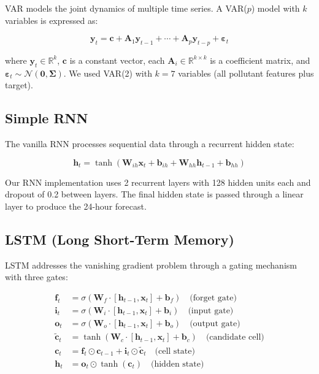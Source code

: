 VAR models the joint dynamics of multiple time series. A VAR($p$) model with $k$ variables is expressed as:

\begin{equation}
    \mathbf{y}_t = \mathbf{c} + \mathbf{A}_1 \mathbf{y}_{t-1} + \cdots + \mathbf{A}_p \mathbf{y}_{t-p} + \boldsymbol{\varepsilon}_t
\end{equation}

where $\mathbf{y}_t \in \mathbb{R}^k$, $\mathbf{c}$ is a constant vector, each $\mathbf{A}_i \in \mathbb{R}^{k \times k}$ is a coefficient matrix, and $\boldsymbol{\varepsilon}_t \sim \mathcal{N}(\mathbf{0}, \boldsymbol{\Sigma})$. We used VAR(2) with $k = 7$ variables (all pollutant features plus target).

\subsection{Simple RNN}

The vanilla RNN processes sequential data through a recurrent hidden state:

\begin{equation}
    \mathbf{h}_t = \tanh(\mathbf{W}_{ih} \mathbf{x}_t + \mathbf{b}_{ih} + \mathbf{W}_{hh} \mathbf{h}_{t-1} + \mathbf{b}_{hh})
\end{equation}

Our RNN implementation uses 2 recurrent layers with 128 hidden units each and dropout of 0.2 between layers. The final hidden state is passed through a linear layer to produce the 24-hour forecast.

\subsection{LSTM (Long Short-Term Memory)}

LSTM addresses the vanishing gradient problem through a gating mechanism with three gates:

\begin{align}
    \mathbf{f}_t &= \sigma(\mathbf{W}_f \cdot [\mathbf{h}_{t-1}, \mathbf{x}_t] + \mathbf{b}_f) \quad \text{(forget gate)} \\
    \mathbf{i}_t &= \sigma(\mathbf{W}_i \cdot [\mathbf{h}_{t-1}, \mathbf{x}_t] + \mathbf{b}_i) \quad \text{(input gate)} \\
    \mathbf{o}_t &= \sigma(\mathbf{W}_o \cdot [\mathbf{h}_{t-1}, \mathbf{x}_t] + \mathbf{b}_o) \quad \text{(output gate)} \\
    \tilde{\mathbf{c}}_t &= \tanh(\mathbf{W}_c \cdot [\mathbf{h}_{t-1}, \mathbf{x}_t] + \mathbf{b}_c) \quad \text{(candidate cell)} \\
    \mathbf{c}_t &= \mathbf{f}_t \odot \mathbf{c}_{t-1} + \mathbf{i}_t \odot \tilde{\mathbf{c}}_t \quad \text{(cell state)} \\
    \mathbf{h}_t &= \mathbf{o}_t \odot \tanh(\mathbf{c}_t) \quad \text{(hidden state)}
\end{align}

